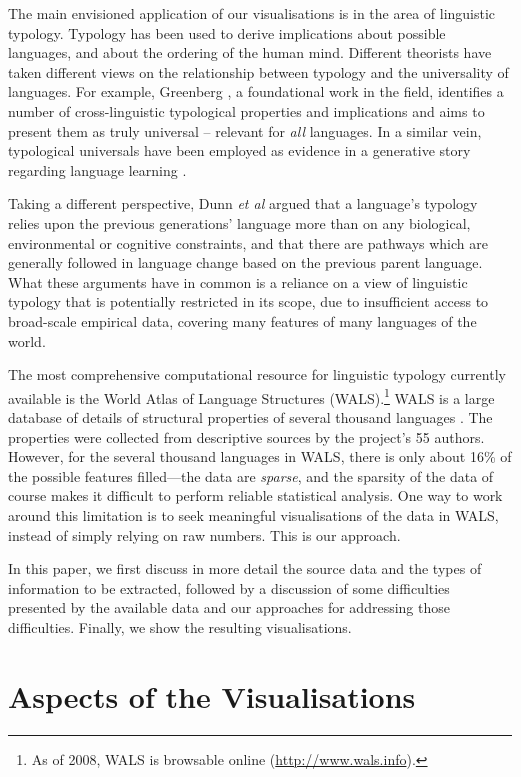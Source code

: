 \documentclass[11pt]{article}
\begin{document}
The main envisioned application of our visualisations is in the area of linguistic typology. Typology has been used to derive implications about possible languages, and about the ordering of the human mind. Different theorists have taken different views on the relationship between typology and the universality of languages. For example, Greenberg , a foundational work in the field, identifies a number of cross-linguistic typological properties and implications and aims to present them as truly universal -- relevant for \textit{all} languages. In a similar vein, typological universals have been employed as evidence in a generative story regarding language learning \cite{chomsky}.

Taking a different perspective, Dunn {\it et al}  argued that a language's typology relies upon the previous generations' language more than on any biological, environmental or cognitive constraints, and that there are pathways which are generally followed in language change based on the previous parent language. What these arguments have in common is a reliance on a view of linguistic typology that is potentially restricted in its scope, due to insufficient access to broad-scale empirical data, covering many features of many languages of the world. 

The most comprehensive computational resource for linguistic typology currently available is the World Atlas of Language Structures (WALS).\footnote{As of 2008, WALS is browsable online (\url{http://www.wals.info}).}  WALS is a large database of details of structural properties of several thousand languages \cite{wals-2011}. The properties were collected from descriptive sources by the project's 55 authors. However, for the several thousand languages in WALS, there is only about 16\% of the possible features filled---the data are \emph{sparse}, and the sparsity of the data of course makes it difficult to perform reliable statistical analysis. One way to work around this limitation is to seek meaningful visualisations of the data in WALS, instead of simply relying on raw numbers. This is our approach. 

In this paper, we first discuss in more detail the source data and the types of information to be extracted, followed by a discussion of some difficulties presented by the available data and our approaches for addressing those difficulties. Finally, we show the resulting visualisations.

\section{Aspects of the Visualisations}
\end{document}
